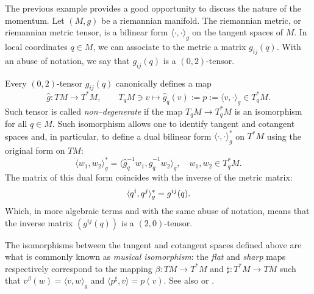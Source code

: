 \documentclass[english,fontsize=11pt,paper=a5,oneside]{scrbook}
\let\d\relax
\newcommand{\d}{\mathrm{d}}
\theoremstyle{definition}
\newenvironment{remark}
  {\pushQED{\qed}\renewcommand{\qedsymbol}{$\lozenge$}\remarkx}
  {\popQED\endremarkx}
\begin{document}
\begin{remark}\label{rem:ptocot}
  The previous example provides a good opportunity to discuss the nature of the momentum.
  Let $(M, g)$ be a riemannian manifold.
  The riemannian metric, or riemannian metric tensor, is a bilinear form $\langle\cdot, \cdot\rangle_g$ on the tangent spaces of $M$.
  In local coordinates $q\in M$, we can associate to the metric a matrix $g_{ij}(q)$.
  With an abuse of notation, we say that $g_{ij}(q)$ is a $(0,2)$-tensor.

  Every $(0,2)$-tensor $g_{ij}(q)$ canonically defines a map
  \begin{equation}
    \hat g: TM \to T^*M, \qquad T_q M \ni v \mapsto \hat g_q(v) := p := \langle v, \cdot\rangle_g \in T^*_q M.
  \end{equation}
  Such tensor is called \emph{non--degenerate} if the map $T_qM \to T_q^* M$ is an isomorphism for all $q\in M$.
  Such isomorphism allows one to identify tangent and cotangent spaces and, in particular, to define a dual bilinear form $\langle\cdot, \cdot\rangle_g^*$ on $T^*M$ using the original form on $TM$:
  \begin{equation}
    \langle w_1, w_2\rangle_g^* = \langle\hat g_q^{-1} w_1, \hat g_q^{-1} w_2\rangle_g, \quad w_1,w_2 \in T^*_q M.
  \end{equation}
  The matrix of this dual form coincides with the inverse of the metric matrix:
  \begin{equation}
    \langle\d q^i, \d q^j\rangle_g^* = g^{ij}(q).
  \end{equation}
  Which, in more algebraic terms and with the same abuse of notation, means that the inverse matrix $(g^{ij}(q))$ is a $(2,0)$-tensor.

  The isomorphisms between the tangent and cotangent spaces defined above are what is commonly known as \emph{musical isomorphism}: the \emph{flat} and \emph{sharp} maps respectively correspond to the mapping $\beta:TM\to T^*M$ and $\sharp:T^*M\to TM$ such that $v^\beta(w) = \langle v,w\rangle_g$ and $\langle p^\sharp, v\rangle = p(v)$.
  See also \cite[Chapter 11]{book:lee} or \cite[Example 6.1.9]{lectures:aom:seri}.
\end{remark}
\end{document}
